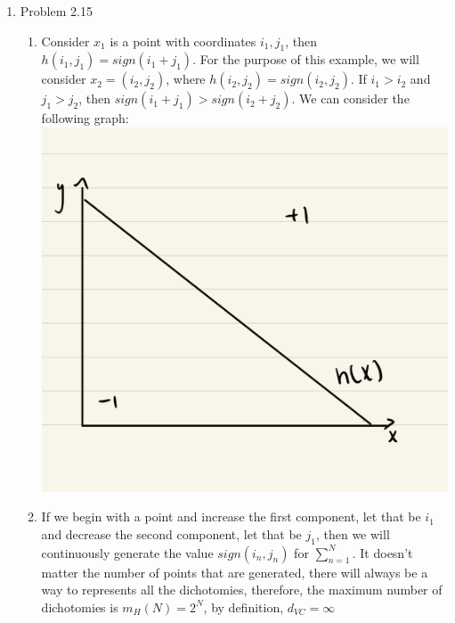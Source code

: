 \documentclass{article}
\begin{document}
\begin{enumerate}
        \item Problem 2.15
        \begin{enumerate}
            \item Consider $x_1$ is a point with coordinates $i_1, j_1$, then $h(i_1, j_1) = sign(i_1 + j_1)$. For the purpose of this example, we will consider $x_2 = (i_2, j_2)$, where $h(i_2, j_2) = sign(i_2, j_2)$. If $i_1 > i_2$ and $j_1 > j_2$, then $sign(i_1 + j_1) > sign(i_2 + j_2)$. We can consider the following graph:\\
            \includegraphics[scale=0.25]{images/2_15_1.png}

            \item If we begin with a point and increase the first component, let that be $i_1$ and decrease the second component, let that be $j_1$, then we will continuously generate the value $sign(i_n, j_n)$ for $\sum_{n = 1}^{N}$. It doesn't matter the number of points that are generated, there will always be a way to represents all the dichotomies, therefore, the maximum number of dichotomies is $m_H(N) = 2^N$, by definition, $d_{VC} = \infty$
        \end{enumerate}


\end{enumerate}
\end{document}

